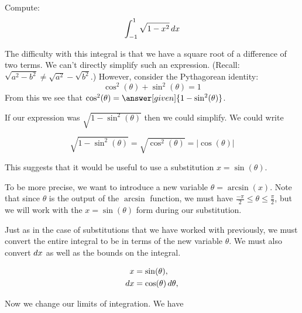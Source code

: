 \documentclass{ximera}
\begin{document}
\begin{example}
  Compute:
  \[
  \int_{-1}^1 \sqrt{1-x^2} \mathop{}\!d x
  \]
  \begin{explanation}

    The difficulty with this integral is that we have a square root of a difference of two terms.
    We can't directly simplify such an expression. (Recall:  $\sqrt{a^2-b^2} \neq \sqrt{a^2} - \sqrt{b^2}$.)  However, consider the Pythagorean identity:
    \[
    \cos^2(\theta) + \sin^2(\theta) = 1
    \]
    From this we see that $\cos^2(\theta)=
    \answer[given]{1-\sin^2(\theta)}$.


   If our expression was $\sqrt{1-\sin^{2}(\theta)}$ then we could simplify.
   We could write 

\[
\sqrt{1-\sin^{2}(\theta)}=\sqrt{\cos^{2}(\theta)}=|\cos(\theta)|
\]
%

This suggests that it would be useful to use a substitution $x=\sin(\theta)$. 

\begin{remark}
To be more precise, we want to introduce a new variable $\theta=\arcsin(x)$. 
Note that since $\theta$ is the output of the $\arcsin$ function, we must have $\frac{-\pi}{2} \leq \theta \leq \frac{\pi}{2} $, but we will work with the $x=\sin(\theta)$ form during our substitution.
\end{remark}

Just as in the case of substitutions that we have worked with previously, we must convert the entire integral to be in terms of the new variable $\theta$. 
We must also convert  $\mathop{}\!d x$ as well as the bounds on the integral.

    \begin{align*}
      x &=\sin(\theta),\\
      \mathop{}\!d x &= \cos(\theta) \mathop{}\!d\theta,
    \end{align*}

   Now we change our limits of
    integration. We have 


\end{explanation}
\end{example}
\end{document}
